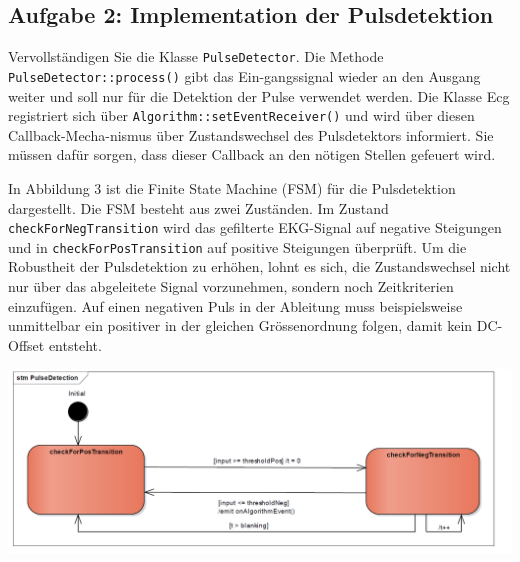 
\noindent\makebox[\linewidth]{\rule{\paperwidth}{0.4pt}}

\noindent\makebox[\linewidth]{\rule{\paperwidth}{0.4pt}}

\noindent\makebox[\linewidth]{\rule{\paperwidth}{0.4pt}}

\noindent\makebox[\linewidth]{\rule{\paperwidth}{0.4pt}}

\noindent\makebox[\linewidth]{\rule{\paperwidth}{0.4pt}}

\subsection{Aufgabe 2: Implementation der Pulsdetektion}

Vervollständigen Sie die Klasse \texttt{PulseDetector}. Die Methode \texttt{PulseDetector::process()} gibt das Ein-gangssignal wieder an den Ausgang weiter und soll nur für die Detektion der Pulse verwendet werden. Die Klasse Ecg registriert sich über \texttt{Algorithm::setEventReceiver()} und wird über diesen Callback-Mecha-nismus über Zustandswechsel des Pulsdetektors informiert. Sie müssen dafür sorgen, dass dieser Callback an den nötigen Stellen gefeuert wird.

In Abbildung 3 ist die Finite State Machine (FSM) für die Pulsdetektion dargestellt. Die FSM besteht aus zwei Zuständen. Im Zustand \texttt{checkForNegTransition} wird das gefilterte EKG-Signal auf negative Steigungen und in \texttt{checkForPosTransition} auf positive Steigungen überprüft. Um die Robustheit der Pulsdetektion zu erhöhen, lohnt es sich, die Zustandswechsel nicht nur über das abgeleitete Signal vorzunehmen, sondern noch Zeitkriterien einzufügen. Auf einen negativen Puls in der Ableitung muss beispielsweise unmittelbar ein positiver in der gleichen Grössenordnung folgen, damit kein DC-Offset entsteht.

\begin{center}
  \includegraphics[width=1\linewidth]{900-Praktika/prak08/3.PNG}
\end{center}


